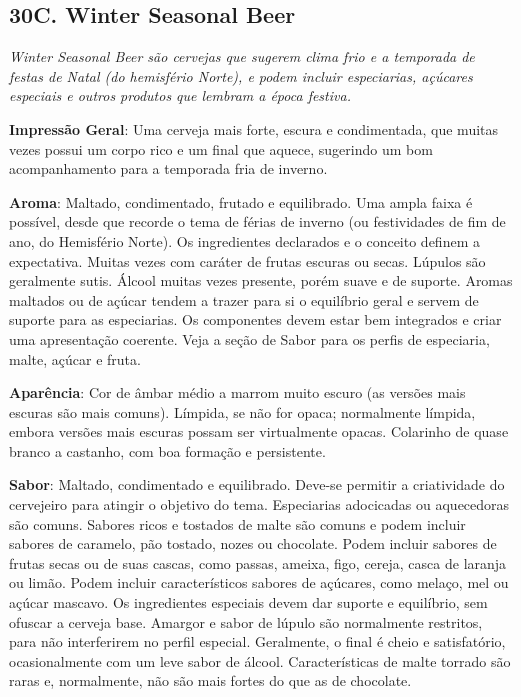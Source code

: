 \subsection*{30C. Winter Seasonal Beer}
\textit{Winter Seasonal Beer são cervejas que sugerem clima frio e a temporada de festas de Natal (do hemisfério Norte), e podem incluir especiarias, açúcares especiais e outros produtos que lembram a época festiva.}

\textbf{Impressão Geral}: Uma cerveja mais forte, escura e condimentada, que muitas vezes possui um corpo rico e um final que aquece, sugerindo um bom acompanhamento para a temporada fria de inverno.

\textbf{Aroma}: Maltado, condimentado, frutado e equilibrado. Uma ampla faixa é possível, desde que recorde o tema de férias de inverno (ou festividades de fim de ano, do Hemisfério Norte). Os ingredientes declarados e o conceito definem a expectativa. Muitas vezes com caráter de frutas escuras ou secas. Lúpulos são geralmente sutis. Álcool muitas vezes presente, porém suave e de suporte. Aromas maltados ou de açúcar tendem a trazer para si o equilíbrio geral e servem de suporte para as especiarias. Os componentes devem estar bem integrados e criar uma apresentação coerente. Veja a seção de Sabor para os perfis de especiaria, malte, açúcar e fruta.

\textbf{Aparência}: Cor de âmbar médio a marrom muito escuro (as versões mais escuras são mais comuns). Límpida, se não for opaca; normalmente límpida, embora versões mais escuras possam ser virtualmente opacas. Colarinho de quase branco a castanho, com boa formação e persistente.

\textbf{Sabor}: Maltado, condimentado e equilibrado. Deve-se permitir a criatividade do cervejeiro para atingir o objetivo do tema. Especiarias adocicadas ou aquecedoras são comuns. Sabores ricos e tostados de malte são comuns e podem incluir sabores de caramelo, pão tostado, nozes ou chocolate. Podem incluir sabores de frutas secas ou de suas cascas, como passas, ameixa, figo, cereja, casca de laranja ou limão. Podem incluir característicos sabores de açúcares, como melaço, mel ou açúcar mascavo. Os ingredientes especiais devem dar suporte e equilíbrio, sem ofuscar a cerveja base. Amargor e sabor de lúpulo são normalmente restritos, para não interferirem no perfil especial. Geralmente, o final é cheio e satisfatório, ocasionalmente com um leve sabor de álcool. Características de malte torrado são raras e, normalmente, não são mais fortes do que as de chocolate.

